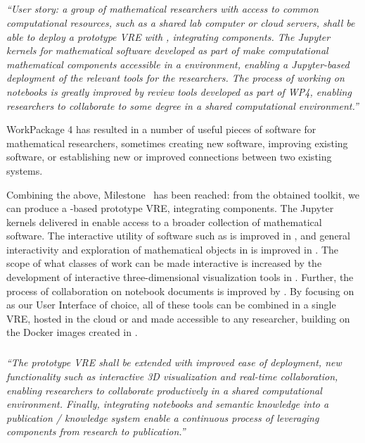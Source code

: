 \subparagraph{}

\emph{“User story: a group of mathematical researchers with access to
  common computational resources, such as a shared lab computer or
  cloud servers, shall be able to deploy a prototype VRE with
  \JupyterHub, integrating \ODK components.
  The Jupyter kernels for mathematical software developed as part of \ODK
  make computational mathematical components accessible in a \Jupyter
  environment, enabling a Jupyter-based deployment of the relevant
  tools for the researchers.
  The process of working on notebooks is greatly improved by review tools
  developed as part of WP4,
  enabling researchers to collaborate to some degree
  in a shared computational environment.”}

WorkPackage 4 has resulted in a number of useful pieces of software
for mathematical researchers,
sometimes creating new software,
improving existing software,
or establishing new or improved connections between two existing systems.

Combining the above, Milestone~ has
been reached:
from the obtained toolkit, we can produce a \Jupyter-based prototype VRE,
integrating \ODK components.
The Jupyter kernels delivered in 
enable access to a broader collection of mathematical software.
The interactive utility of software such as \Pari is improved in ,
and general interactivity and exploration of mathematical objects in \Sage is improved in .
The scope of what classes of work can be made interactive is increased
by the development of interactive three-dimensional visualization tools in .
Further, the process of collaboration on notebook documents is improved by .
By focusing on \Jupyter as our User Interface of choice,
all of these tools can be combined in a single VRE,
hosted in the cloud or and made accessible to any researcher,
building on the Docker images created in .


\subparagraph{}

\emph{“The prototype VRE shall be extended with improved ease of deployment, new
  functionality such as interactive 3D visualization and real-time
  collaboration, enabling researchers to collaborate productively in a shared
  computational environment. Finally, integrating notebooks and semantic
  knowledge into a publication / knowledge system enable a continuous process
  of leveraging \ODK components from research to publication.”}

